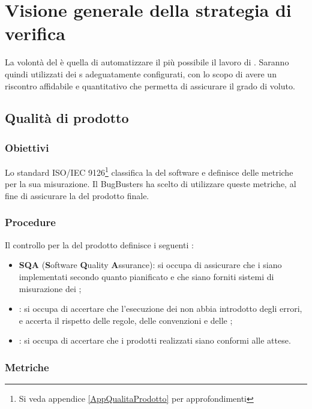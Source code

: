 \newpage
\section{Visione generale della strategia di verifica}
La volontà del  è quella di automatizzare il più possibile il lavoro di . Saranno quindi utilizzati dei s adeguatamente configurati, con lo scopo di avere un riscontro affidabile e quantitativo che permetta di assicurare il grado di  voluto. 

\subsection{Qualità di prodotto}
\subsubsection{Obiettivi}
Lo standard ISO/IEC 9126\footnote{Si veda appendice \ref{AppQualitaProdotto} per approfondimenti} classifica la  del software e definisce delle metriche per la sua misurazione. Il  BugBusters ha scelto di utilizzare queste metriche, al fine di assicurare la  del prodotto finale.

\subsubsection{Procedure}
Il controllo per la  del prodotto definisce i seguenti :
\begin{itemize}
	\item \textbf{SQA} (\textbf{S}oftware \textbf{Q}uality \textbf{A}ssurance): si occupa di assicurare che i  siano implementati secondo quanto pianificato e che siano forniti sistemi di misurazione dei ;
	\item \textbf{}: si occupa di accertare che l'esecuzione dei  non abbia introdotto degli errori, e accerta il rispetto delle regole, delle convenzioni e delle ;
	\item \textbf{}: si occupa di accertare che i prodotti realizzati siano conformi alle attese.
\end{itemize}

\subsubsection{Metriche}\label{MetricheSoftware}
